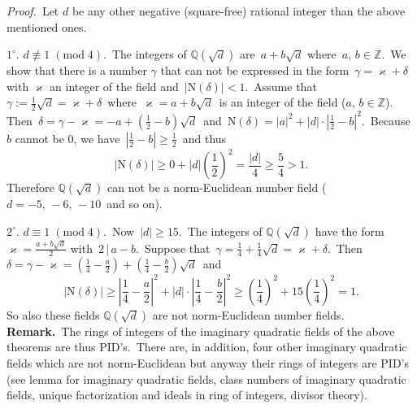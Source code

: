 \documentclass[12pt]{article}
\theoremstyle{definition}
\begin{document}
{\em Proof.}\, Let $d$ be any other negative (square-free) rational integer than the above mentioned ones.

$1^\circ.$\; $d \not\equiv 1\;(\mbox{mod}\;4)$.\, The integers of $\mathbb{Q}(\sqrt{d})$ are\, $a+b\sqrt{d}$ where\, $a,\,b\in\mathbb{Z}$.\, We show that there is a number $\gamma$ that can not be expressed in the form\, 
$\gamma = \varkappa+\delta$\, with $\varkappa$ an integer of the field and\, $|\mbox{N}(\delta)| < 1$.\,  Assume that\, $\gamma := \frac{1}{2}\sqrt{d} = \varkappa+\delta$\, where\, $\varkappa = a+b\sqrt{d}$\, is an integer of the field ($a,\,b\in\mathbb{Z}$).\, Then\, $\delta = \gamma-\varkappa = 
-a+(\frac{1}{2}-b)\sqrt{d}$\, and\, $\mbox{N}(\delta) = 
|a|^2+|d|\cdot|\frac{1}{2}-b|^2$.\, Because $b$ cannot be 0, we have\, 
$|\frac{1}{2}-b| \ge \frac{1}{2}$\, and thus
$$|\mbox{N}(\delta)| \ge 0+|d|\left(\frac{1}{2}\right)^2 = \frac{|d|}{4}\ge \frac{5}{4} > 1.$$
Therefore $\mathbb{Q}(\sqrt{d})$ can not be a norm-Euclidean number field 
($d = -5,\,-6,\,-10$\, and so on).

$2^\circ.$\; $d \equiv 1\;(\mbox{mod}\;4)$.\, Now\, $|d| \ge 15$.\, The integers of $\mathbb{Q}(\sqrt{d})$ have the form 
$\varkappa = \frac{a+b\sqrt{d}}{2}$ with\, $2\,|\,a-b$.\, Suppose that\, 
$\gamma = \frac{1}{4}+\frac{1}{4}\sqrt{d} = \varkappa+\delta$.\, Then\, 
$\delta = \gamma-\varkappa = (\frac{1}{4}-\frac{a}{2})+
(\frac{1}{4}-\frac{b}{2})\sqrt{d}$\, and
 $$|\mbox{N}(\delta)| \ge 
\left|\frac{1}{4}-\frac{a}{2}\right|^2+|d|\cdot\left|\frac{1}{4}-\frac{b}{2}\right|^2 \ge 
\left(\frac{1}{4}\right)^2\!+15\left(\frac{1}{4}\right)^2 = 1.$$
So also these fields $\mathbb{Q}(\sqrt{d})$ are not norm-Euclidean number fields.\\


\textbf{Remark.}\, The rings of integers of the imaginary quadratic fields of the above theorems are thus PID's.\, There are, in addition, four other imaginary quadratic fields which are not norm-Euclidean but anyway their rings of integers are PID's (see lemma for imaginary quadratic fields, class numbers of imaginary quadratic fields, unique factorization and ideals in ring of integers, divisor theory).
\end{document}
